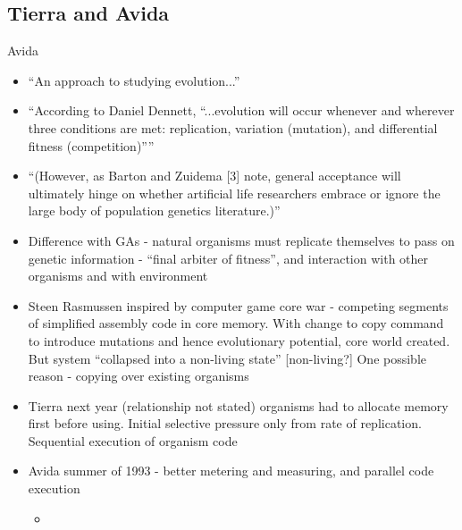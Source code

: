 \subsection{Tierra and Avida}

\autocite{Ofria2004}

Avida
\begin{itemize}
	\item
	
	``An approach to studying evolution...''
	
	\item
	
	``According to Daniel Dennett, ``...evolution will occur whenever and
	wherever three conditions are met: replication, variation (mutation),
	and differential fitness (competition)''''
	
	\item
	
	``(However, as Barton and Zuidema {[}3{]} note, general acceptance
	will ultimately hinge on whether artificial life researchers embrace
	or ignore the large body of population genetics literature.)''
	
	\item
	
	Difference with GAs - natural organisms must replicate themselves to
	pass on genetic information - ``final arbiter of fitness'', and
	interaction with other organisms and with environment
	
	\item
	
	Steen Rasmussen inspired by computer game core war - competing
	segments of simplified assembly code in core memory. With change to
	copy command to introduce mutations and hence evolutionary potential,
	core world created. But system ``collapsed into a non-living state''
	{[}non-living?{]} One possible reason - copying over existing
	organisms
	
	\item
	
	Tierra next year (relationship not stated) organisms had to allocate
	memory first before using. Initial selective pressure only from rate
	of replication. Sequential execution of organism code
	
	\item
	
	Avida summer of 1993 - better metering and measuring, and parallel
	code execution
	
	
	\begin{itemize}
		\item
		

\end{itemize}
\end{itemize}
